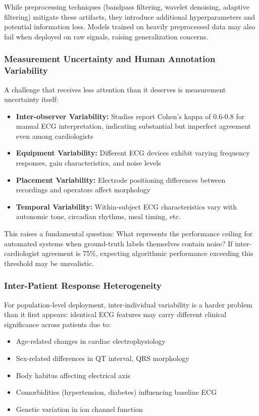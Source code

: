 While preprocessing techniques (bandpass filtering, wavelet denoising, adaptive filtering) mitigate these artifacts, they introduce additional hyperparameters and potential information loss. Models trained on heavily preprocessed data may also fail when deployed on raw signals, raising generalization concerns.

\subsubsection{Measurement Uncertainty and Human Annotation Variability}

A challenge that receives less attention than it deserves is measurement uncertainty itself:

\begin{itemize}
    \item \textbf{Inter-observer Variability:} Studies report Cohen's kappa of 0.6-0.8 for manual ECG interpretation, indicating substantial but imperfect agreement even among cardiologists
    \item \textbf{Equipment Variability:} Different ECG devices exhibit varying frequency responses, gain characteristics, and noise levels
    \item \textbf{Placement Variability:} Electrode positioning differences between recordings and operators affect morphology
    \item \textbf{Temporal Variability:} Within-subject ECG characteristics vary with autonomic tone, circadian rhythms, meal timing, etc.
\end{itemize}

This raises a fundamental question: What represents the performance ceiling for automated systems when ground-truth labels themselves contain noise? If inter-cardiologist agreement is 75\%, expecting algorithmic performance exceeding this threshold may be unrealistic.

\subsubsection{Inter-Patient Response Heterogeneity}

For population-level deployment, inter-individual variability is a harder problem than it first appears: identical ECG features may carry different clinical significance across patients due to:

\begin{itemize}
    \item Age-related changes in cardiac electrophysiology
    \item Sex-related differences in QT interval, QRS morphology
    \item Body habitus affecting electrical axis
    \item Comorbidities (hypertension, diabetes) influencing baseline ECG
    \item Genetic variation in ion channel function
\end{itemize}

